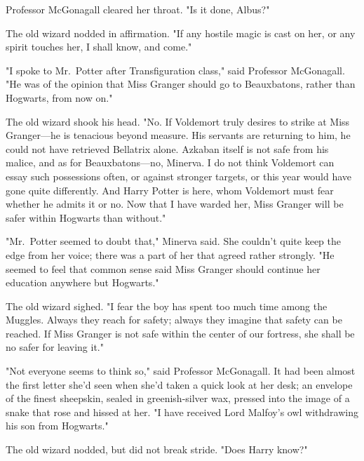 Professor McGonagall cleared her throat. "Is it done, Albus?"

The old wizard nodded in affirmation. "If any hostile magic is cast on her, or
any spirit touches her, I shall know, and come."

"I spoke to Mr.~Potter after Transfiguration class," said Professor McGonagall.
"He was of the opinion that Miss Granger should go to Beauxbatons, rather than
Hogwarts, from now on."

The old wizard shook his head. "No. If Voldemort truly desires to strike at
Miss Granger---he is tenacious beyond measure. His servants are returning to
him, he could not have retrieved Bellatrix alone. Azkaban itself is not safe
from his malice, and as for Beauxbatons---no, Minerva. I do not think Voldemort
can essay such possessions often, or against stronger targets, or this year
would have gone quite differently. And Harry Potter is here, whom Voldemort
must fear whether he admits it or no. Now that I have warded her, Miss Granger
will be safer within Hogwarts than without."

"Mr.~Potter seemed to doubt that," Minerva said. She couldn't quite keep the
edge from her voice; there was a part of her that agreed rather strongly. "He
seemed to feel that common sense said Miss Granger should continue her
education anywhere but Hogwarts."

The old wizard sighed. "I fear the boy has spent too much time among the
Muggles. Always they reach for safety; always they imagine that safety can be
reached. If Miss Granger is not safe within the center of our fortress, she
shall be no safer for leaving it."

"Not everyone seems to think so," said Professor McGonagall. It had been almost
the first letter she'd seen when she'd taken a quick look at her desk; an
envelope of the finest sheepskin, sealed in greenish-silver wax, pressed into
the image of a snake that rose and hissed at her. "I have received Lord
Malfoy's owl withdrawing his son from Hogwarts."

The old wizard nodded, but did not break stride. "Does Harry know?"

